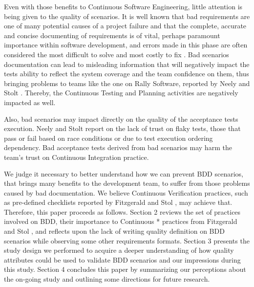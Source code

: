 Even with those benefits to Continuous Software Engineering, little attention is being given to the quality of scenarios. It is well known that bad requirements are one of many potential causes of a project failure \cite{CHAOS_2015} and that the complete, accurate and concise documenting of requirements is of vital, perhaps paramount importance within software development, and errors made in this phase are often considered the most difficult to solve and most costly to fix \cite{Phalp_et_dot_al_2011}. Bad scenarios documentation can lead to misleading information that will negatively impact the tests ability to reflect the system coverage and the team confidence on them, thus bringing problems to teams like the one on Rally Software, reported by Neely and Stolt \cite{Neely_Stolt_2013}. Thereby, the Continuous Testing and Planning activities are negatively impacted as well. 

Also, bad scenarios may impact directly on the quality of the acceptance tests execution. Neely and Stolt \cite{Neely_Stolt_2013} report on the lack of trust on flaky tests, those that pass or fail based on race conditions or due to test execution ordering dependency. Bad acceptance tests derived from bad scenarios may harm the team's trust on Continuous Integration practice.

We judge it necessary to better understand how we can prevent BDD scenarios, that brings many benefits to the development team, to suffer from those problems caused by bad documentation. We believe Continuous Verification practices, such as pre-defined checklists reported by Fitzgerald and Stol \cite{Fitzgerald_Stol_2014}, may achieve that. Therefore, this paper proceeds as follows. Section 2 reviews the set of practices involved on BDD, their importance to Continuous * practices from Fitzgerald and Stol \cite{Fitzgerald_Stol_2014}, and reflects upon the lack of writing quality definition on BDD scenarios while observing some other requirements formats. Section 3 presents the study design we performed to acquire a deeper understanding of how quality attributes could be used to validate BDD scenarios and our impressions during this study. Section 4 concludes this paper by summarizing our perceptions about the on-going study and outlining some directions for future research.
